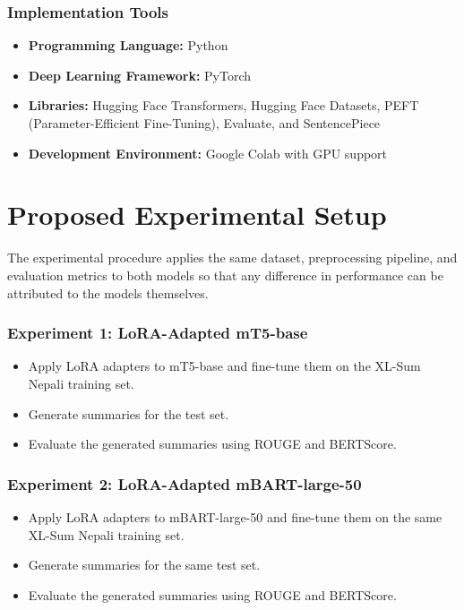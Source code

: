\documentclass[12pt]{report}
\begin{document}
\subsection{Implementation Tools}
\begin{itemize}
    \item \textbf{Programming Language:} Python
    \item \textbf{Deep Learning Framework:} PyTorch
    \item \textbf{Libraries:} Hugging Face Transformers, Hugging Face Datasets, PEFT (Parameter-Efficient Fine-Tuning), Evaluate, and SentencePiece
    \item \textbf{Development Environment:} Google Colab with GPU support
\end{itemize}


\chapter{Proposed Experimental Setup}
The experimental procedure applies the same dataset, preprocessing pipeline, and evaluation metrics to both models so that any difference in performance can be attributed to the models themselves.

\subsection{Experiment 1: LoRA-Adapted mT5-base}
\begin{itemize}
    \item Apply LoRA adapters to mT5-base and fine-tune them on the XL-Sum Nepali training set.
    \item Generate summaries for the test set.
    \item Evaluate the generated summaries using ROUGE and BERTScore.
\end{itemize}

\subsection{Experiment 2: LoRA-Adapted mBART-large-50}
\begin{itemize}
    \item Apply LoRA adapters to mBART-large-50 and fine-tune them on the same XL-Sum Nepali training set.
    \item Generate summaries for the same test set.
    \item Evaluate the generated summaries using ROUGE and BERTScore.
\end{itemize}
\end{document}
